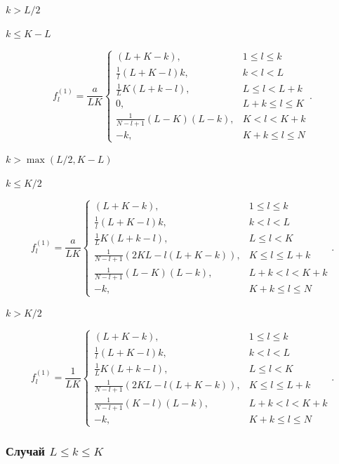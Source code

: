 \documentclass[specialist,
               substylefile = spbu.rtx,
               subf,href,colorlinks=true, 12pt]{disser}
\begin{document}
$k > L/2$

$k \leq K - L$

$$f^{(1)}_l = \frac{a}{{LK}}
\begin{cases}
	(L + K - k), & \text{$1 \leq l \leq k$}\\
	\frac{1}{l}(L + K - l)k, & \text{$k < l < L$}\\
	\frac{1}{L}K(L + k - l), &\text{$L \leq l < L + k$}\\
	0, &\text{$L + k \leq l \leq K$}\\
	\frac{1}{N - l + 1}(L - K)(L - k), &\text{$K < l < K + k$}\\
	-k, &\text{$K + k \leq l \leq N$}
\end{cases}.
$$

$k > \max(L / 2, K - L)$

$k \leq K/2$

$$f^{(1)}_l = \frac{a}{{LK}}
\begin{cases}
	(L + K - k), & \text{$1 \leq l \leq k$}\\
	\frac{1}{l}(L + K - l)k, & \text{$k < l < L$}\\
	\frac{1}{L}K(L + k - l), &\text{$L \leq l < K$}\\
	\frac{1}{N - l + 1}(2KL - l(L + K - k)), &\text{$K \leq l \leq L + k$}\\
	\frac{1}{N - l + 1}(L - K)(L - k), &\text{$L + k < l < K + k$}\\
	-k, &\text{$K + k \leq l \leq N$}
\end{cases}.
$$

$k > K/2$


$$f^{(1)}_l = \frac{1}{{LK}}
\begin{cases}
	(L + K - k), & \text{$1 \leq l \leq k$}\\
	\frac{1}{l}(L + K - l)k, & \text{$k < l < L$}\\
	\frac{1}{L}K(L + k - l), &\text{$L \leq l < K$}\\
	\frac{1}{N - l + 1}(2KL - l(L + K - k)), &\text{$K \leq l \leq L + k$}\\
	\frac{1}{N - l + 1}(K - l)(L - k), &\text{$L + k < l < K + k$}\\
	-k, &\text{$K + k \leq l \leq N $}
\end{cases}.
$$

\subsubsection{Случай $L \leq k \leq K$}
\end{document}
